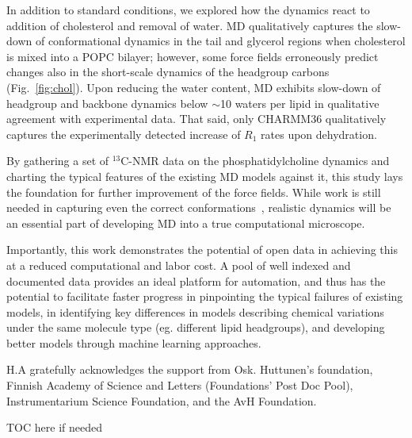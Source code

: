 \documentclass[journal=jcisd8,manuscript=article,layout=twocolumn]{achemso}
\begin{document}

In addition to standard conditions, we explored how the dynamics react to addition of cholesterol and removal of water.
%
MD qualitatively captures the slow-down of conformational dynamics in the tail and glycerol regions  when cholesterol is mixed into a POPC bilayer; however, some force fields erroneously predict changes also in the short-scale dynamics of the headgroup carbons (Fig.~\ref{fig:chol}).
%
Upon reducing the water content, MD exhibits slow-down of headgroup and backbone dynamics below $\sim$10 waters per lipid in qualitative agreement with experimental data. That said, only CHARMM36 qualitatively captures the experimentally detected increase of $R_1$ rates upon dehydration.  

By gathering a set of $^{13}$C-NMR data on the phosphatidylcholine dynamics and charting the typical features of the existing MD models against it, this study lays the foundation for further improvement of the force fields. While work is still needed in capturing even the correct conformations~\cite{botan15}, realistic dynamics will be an essential part of developing MD into a true computational microscope.

Importantly, this work demonstrates the potential of open data in achieving this at a reduced computational and labor cost. A pool of well indexed and documented data provides an ideal platform for automation, and thus has the potential to facilitate faster progress in pinpointing the typical failures of existing models, in identifying key differences in models describing chemical variations under the same molecule type (eg. different lipid headgroups), and developing better models through machine learning approaches.


\acknowledgement
H.A gratefully acknowledges the support from Osk. Huttunen's foundation, Finnish Academy of Science and Letters (Foundations’ Post Doc Pool), Instrumentarium Science Foundation, and the AvH Foundation.



\begin{tocentry}
 TOC here if needed
\end{tocentry}
\end{document}
